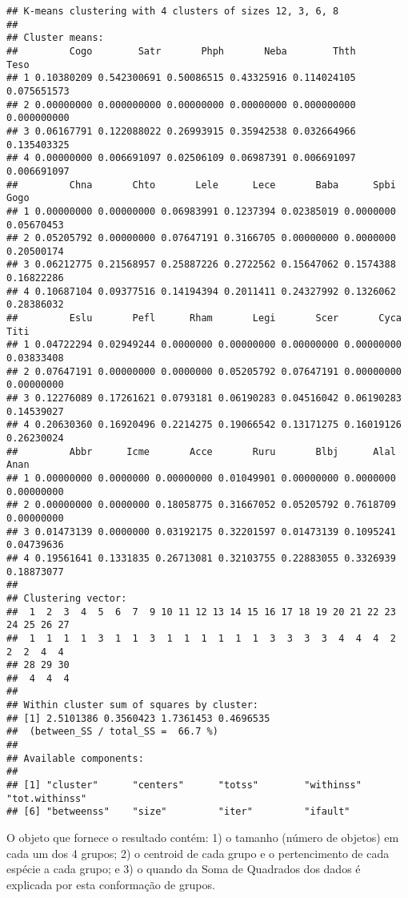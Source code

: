 \documentclass[
]{book}
\begin{document}
\begin{verbatim}
## K-means clustering with 4 clusters of sizes 12, 3, 6, 8
## 
## Cluster means:
##         Cogo        Satr       Phph       Neba        Thth        Teso
## 1 0.10380209 0.542300691 0.50086515 0.43325916 0.114024105 0.075651573
## 2 0.00000000 0.000000000 0.00000000 0.00000000 0.000000000 0.000000000
## 3 0.06167791 0.122088022 0.26993915 0.35942538 0.032664966 0.135403325
## 4 0.00000000 0.006691097 0.02506109 0.06987391 0.006691097 0.006691097
##         Chna       Chto       Lele      Lece       Baba      Spbi       Gogo
## 1 0.00000000 0.00000000 0.06983991 0.1237394 0.02385019 0.0000000 0.05670453
## 2 0.05205792 0.00000000 0.07647191 0.3166705 0.00000000 0.0000000 0.20500174
## 3 0.06212775 0.21568957 0.25887226 0.2722562 0.15647062 0.1574388 0.16822286
## 4 0.10687104 0.09377516 0.14194394 0.2011411 0.24327992 0.1326062 0.28386032
##         Eslu       Pefl      Rham       Legi       Scer       Cyca       Titi
## 1 0.04722294 0.02949244 0.0000000 0.00000000 0.00000000 0.00000000 0.03833408
## 2 0.07647191 0.00000000 0.0000000 0.05205792 0.07647191 0.00000000 0.00000000
## 3 0.12276089 0.17261621 0.0793181 0.06190283 0.04516042 0.06190283 0.14539027
## 4 0.20630360 0.16920496 0.2214275 0.19066542 0.13171275 0.16019126 0.26230024
##         Abbr      Icme       Acce       Ruru       Blbj      Alal       Anan
## 1 0.00000000 0.0000000 0.00000000 0.01049901 0.00000000 0.0000000 0.00000000
## 2 0.00000000 0.0000000 0.18058775 0.31667052 0.05205792 0.7618709 0.00000000
## 3 0.01473139 0.0000000 0.03192175 0.32201597 0.01473139 0.1095241 0.04739636
## 4 0.19561641 0.1331835 0.26713081 0.32103755 0.22883055 0.3326939 0.18873077
## 
## Clustering vector:
##  1  2  3  4  5  6  7  9 10 11 12 13 14 15 16 17 18 19 20 21 22 23 24 25 26 27 
##  1  1  1  1  3  1  1  3  1  1  1  1  1  1  3  3  3  3  4  4  4  2  2  2  4  4 
## 28 29 30 
##  4  4  4 
## 
## Within cluster sum of squares by cluster:
## [1] 2.5101386 0.3560423 1.7361453 0.4696535
##  (between_SS / total_SS =  66.7 %)
## 
## Available components:
## 
## [1] "cluster"      "centers"      "totss"        "withinss"     "tot.withinss"
## [6] "betweenss"    "size"         "iter"         "ifault"
\end{verbatim}

O objeto que fornece o resultado contém: 1) o tamanho (número de objetos) em cada um dos 4 grupos; 2) o centroid de cada grupo e o pertencimento de cada espécie a cada grupo; e 3) o quando da Soma de Quadrados dos dados é explicada por esta conformação de grupos.
\end{document}
